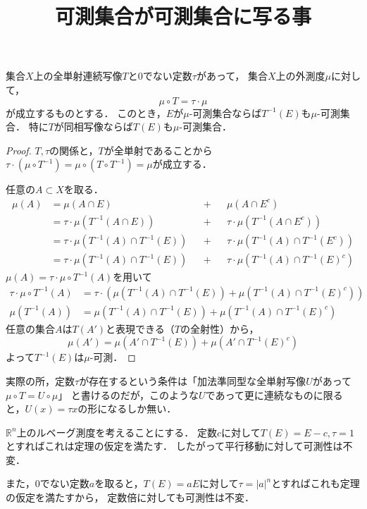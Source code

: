 \documentclass[a4j]{jarticle}
\title{可測集合が可測集合に写る事}
\begin{document}
\maketitle

\begin{Thm}
    集合$X$上の全単射連続写像$T$と0でない定数$\tau$があって，
    集合$X$上の外測度$\mu$に対して，
    \[ \mu \circ T=\tau \cdot \mu \]
    が成立するものとする．
    このとき，$E$が$\mu$-可測集合ならば$T^{-1}(E)$も$\mu$-可測集合．
    特に$T$が同相写像ならば$T(E)$も$\mu$-可測集合．
\end{Thm}
\begin{proof}
    $T,\tau$の関係と，$T$が全単射であることから
    $\tau \cdot (\mu \circ T^{-1})=\mu \circ (T \circ T^{-1})=\mu$が成立する．

    任意の$A \subset X$を取る．
    \begin{align*}
        \mu(A)
        &=\mu(A \cap E)                              &&+&&   \mu(A \cap E^c) \\
        &=\tau \cdot \mu(T^{-1}(A \cap E))           &&+&&   \tau \cdot \mu(T^{-1}(A \cap E^c)) \\
        &=\tau \cdot \mu(T^{-1}(A) \cap T^{-1}(E))   &&+&&   \tau \cdot \mu(T^{-1}(A) \cap T^{-1}(E^c)) \\
        &=\tau \cdot \mu(T^{-1}(A) \cap T^{-1}(E))   &&+&&   \tau \cdot \mu(T^{-1}(A) \cap T^{-1}(E)^c)
    \end{align*}
    $\mu(A)=\tau \cdot \mu \circ T^{-1}(A)$を用いて
    \begin{align*}
        \tau \cdot \mu \circ T^{-1}(A)&=\tau \cdot (\mu(T^{-1}(A) \cap T^{-1}(E))+\mu(T^{-1}(A) \cap T^{-1}(E)^c)) \\
        \mu(T^{-1}(A))&=\mu(T^{-1}(A) \cap T^{-1}(E))+\mu(T^{-1}(A) \cap T^{-1}(E)^c)
    \end{align*}
    任意の集合$A$は$T(A')$と表現できる（$T$の全射性）から，
    \[ \mu(A')=\mu(A' \cap T^{-1}(E))+\mu(A' \cap T^{-1}(E)^c) \]
    よって$T^{-1}(E)$は$\mu$-可測．
\end{proof}
実際の所，定数$\tau$が存在するという条件は「加法準同型な全単射写像$U$があって$\mu \circ T=U \circ \mu$」
と書けるのだが，このような$U$であって更に連続なものに限ると，$U(x)=\tau x$の形になるしか無い．

\begin{Example}
    $\mathbb{R}^n$上のルベーグ測度を考えることにする．
    定数$c$に対して$T(E)=E-c, \tau=1$とすればこれは定理の仮定を満たす．
    したがって平行移動に対して可測性は不変．

    また，0でない定数$a$を取ると，$T(E)=aE$に対して$\tau=|a|^n$とすればこれも定理の仮定を満たすから，
    定数倍に対しても可測性は不変．
\end{Example}
\end{document}
